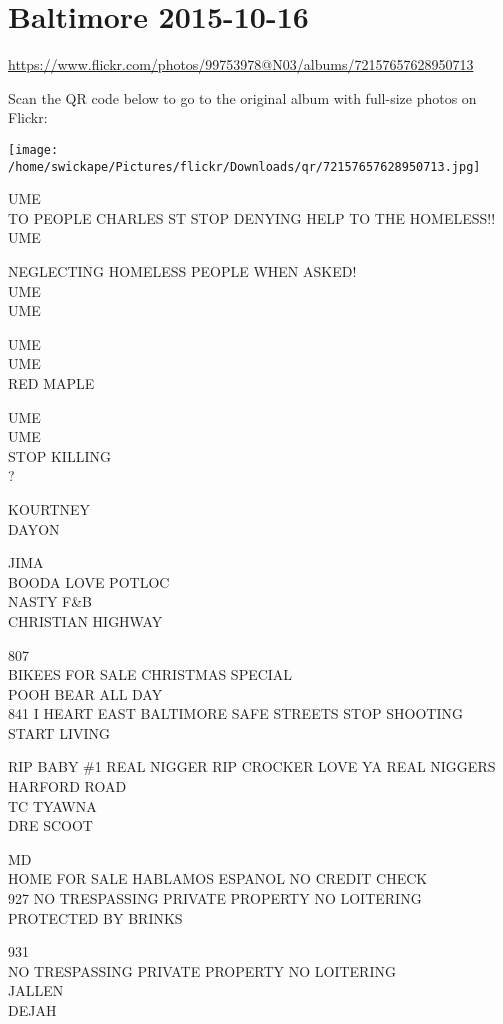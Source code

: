 \documentclass[10pt,letterpaper]{article}
\begin{document}
\section*{Baltimore 2015-10-16}

\url{https://www.flickr.com/photos/99753978@N03/albums/72157657628950713}

Scan the QR code below to go to the original album with full-size photos on Flickr:

\texttt{[image: /home/swickape/Pictures/flickr/Downloads/qr/72157657628950713.jpg]}
\pagebreak

UME\\
TO PEOPLE CHARLES ST STOP DENYING HELP TO THE HOMELESS!!\\
UME

NEGLECTING HOMELESS PEOPLE WHEN ASKED!\\
UME\\
UME

UME\\
UME\\
RED MAPLE

UME\\
UME\\
STOP KILLING\\
?

KOURTNEY\\
DAYON

JIMA\\
BOODA LOVE POTLOC\\
NASTY F\&B\\
CHRISTIAN HIGHWAY

807\\
BIKEES FOR SALE CHRISTMAS SPECIAL\\
POOH BEAR ALL DAY\\
841 I HEART EAST BALTIMORE SAFE STREETS STOP SHOOTING START LIVING

RIP BABY \#1  REAL NIGGER RIP CROCKER LOVE YA REAL NIGGERS\\
HARFORD ROAD\\
TC TYAWNA\\
DRE SCOOT

MD\\
HOME FOR SALE HABLAMOS ESPANOL NO CREDIT CHECK\\
927 NO TRESPASSING PRIVATE PROPERTY NO LOITERING\\
PROTECTED BY BRINKS

931\\
NO TRESPASSING PRIVATE PROPERTY NO LOITERING\\
JALLEN\\
DEJAH
\end{document}
